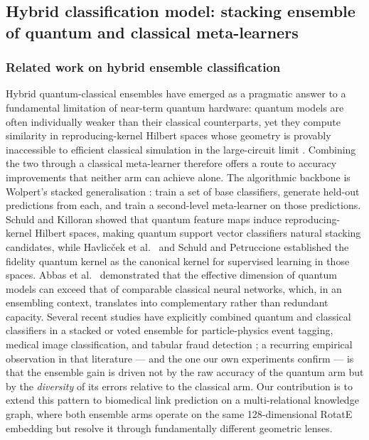 \documentclass[twocolumn,10pt]{article}
\begin{document}
\subsection{Hybrid classification model: stacking ensemble of quantum and classical meta-learners}
\label{sec:hybrid}

\subsubsection*{Related work on hybrid ensemble classification}

Hybrid quantum-classical ensembles have emerged as a pragmatic answer to a fundamental limitation of near-term quantum hardware: quantum models are often individually weaker than their classical counterparts, yet they compute similarity in reproducing-kernel Hilbert spaces whose geometry is provably inaccessible to efficient classical simulation in the large-circuit limit \cite{havlicek2019,liu2021,schuld2019}. Combining the two through a classical meta-learner therefore offers a route to accuracy improvements that neither arm can achieve alone. The algorithmic backbone is Wolpert's stacked generalisation \cite{wolpert1992}: train a set of base classifiers, generate held-out predictions from each, and train a second-level meta-learner on those predictions. Schuld and Killoran \cite{schuld2019} showed that quantum feature maps induce reproducing-kernel Hilbert spaces, making quantum support vector classifiers natural stacking candidates, while Havlic\v{c}ek et al.\ \cite{havlicek2019} and Schuld and Petruccione \cite{schuld2021} established the fidelity quantum kernel as the canonical kernel for supervised learning in those spaces. Abbas et al.\ \cite{abbas2021} demonstrated that the effective dimension of quantum models can exceed that of comparable classical neural networks, which, in an ensembling context, translates into complementary rather than redundant capacity. Several recent studies have explicitly combined quantum and classical classifiers in a stacked or voted ensemble for particle-physics event tagging, medical image classification, and tabular fraud detection \cite{incudini2023}; a recurring empirical observation in that literature --- and the one our own experiments confirm --- is that the ensemble gain is driven not by the raw accuracy of the quantum arm but by the \emph{diversity} of its errors relative to the classical arm. Our contribution is to extend this pattern to biomedical link prediction on a multi-relational knowledge graph, where both ensemble arms operate on the same 128-dimensional RotatE embedding but resolve it through fundamentally different geometric lenses.
\end{document}
